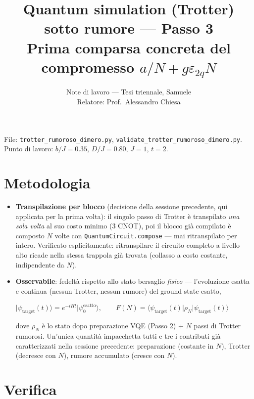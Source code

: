 \documentclass[11pt,a4paper]{article}
\title{\vspace{-1.5em}\color{inkblue}Quantum simulation (Trotter) sotto rumore --- Passo 3\\[0.2em]
\Large\normalfont\color{softgray}Prima comparsa concreta del compromesso $a/N+g\varepsilon_{2q}N$}
\author{Note di lavoro --- Tesi triennale, Samuele\\ Relatore: Prof.\ Alessandro Chiesa}
\date{}
\newcommand{\ket}[1]{\lvert #1 \rangle}
\newcommand{\bra}[1]{\langle #1 \rvert}
\begin{document}
\sloppy
\maketitle
\thispagestyle{fancy}
\vspace{-2.2em}

File: \texttt{trotter\_rumoroso\_dimero.py}, \texttt{validate\_trotter\_rumoroso\_dimero.py}.
Punto di lavoro: $b/J=0.35$, $D/J=0.80$, $J=1$, $t=2$.

\section*{Metodologia}

\begin{itemize}[leftmargin=1.3em,itemsep=0.3em]
\item \textbf{Transpilazione per blocco} (decisione della sessione
precedente, qui applicata per la prima volta): il singolo passo di Trotter
è transpilato \emph{una sola volta} al suo costo minimo (3 CNOT), poi il
blocco già compilato è composto $N$ volte con \texttt{QuantumCircuit.compose}
--- mai ritranspilato per intero. Verificato esplicitamente: ritranspilare
il circuito completo a livello alto ricade nella stessa trappola già
trovata (collasso a costo costante, indipendente da $N$).
\item \textbf{Osservabile}: fedeltà rispetto allo stato bersaglio
\emph{fisico} --- l'evoluzione esatta e continua (nessun Trotter, nessun
rumore) del ground state esatto,
\begin{keyeq}
\centering
$\ket{\psi_\text{target}(t)}=e^{-iHt}\ket{\psi_0^\text{esatto}}, \qquad
F(N)=\bra{\psi_\text{target}(t)}\rho_N\ket{\psi_\text{target}(t)}$
\end{keyeq}
dove $\rho_N$ è lo stato dopo preparazione VQE (Passo 2) + $N$ passi di
Trotter rumorosi. Un'unica quantità impacchetta tutti e tre i contributi
già caratterizzati nella sessione precedente: preparazione (costante in
$N$), Trotter (decresce con $N$), rumore accumulato (cresce con $N$).
\end{itemize}

\section*{Verifica}
\end{document}
